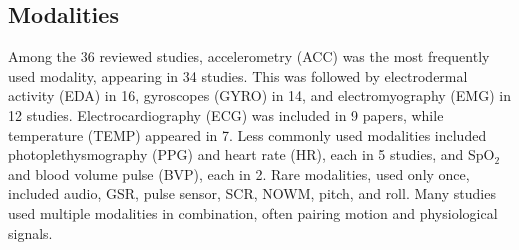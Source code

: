 \subsection{Modalities}

Among the 36 reviewed studies, accelerometry (ACC) was the most frequently used modality, appearing in 34 studies. This was followed by electrodermal activity (EDA) in 16, gyroscopes (GYRO) in 14, and electromyography (EMG) in 12 studies. Electrocardiography (ECG) was included in 9 papers, while temperature (TEMP) appeared in 7.
Less commonly used modalities included photoplethysmography (PPG) and heart rate (HR), each in 5 studies, and SpO$_2$ and blood volume pulse (BVP), each in 2. Rare modalities, used only once, included audio, GSR, pulse sensor, SCR, NOWM, pitch, and roll. Many studies used multiple modalities in combination, often pairing motion and physiological signals.
